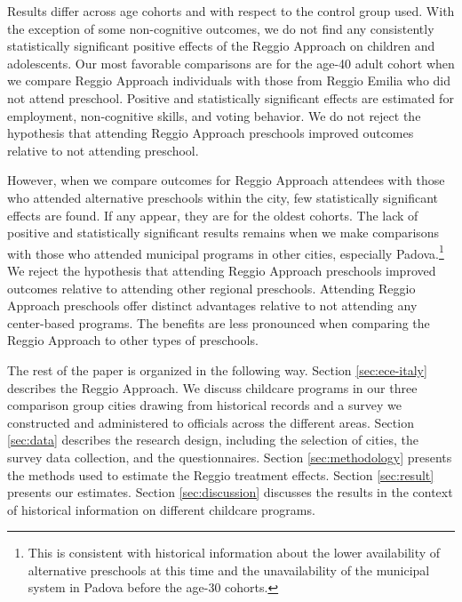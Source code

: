 Results differ across age cohorts and with respect to the control group used. With the exception of some non-cognitive outcomes, we do not find any consistently statistically significant positive effects of the Reggio Approach on children and adolescents. Our most favorable comparisons are for the age-40 adult cohort when we compare Reggio Approach individuals with those from Reggio Emilia who did not attend preschool. Positive and statistically significant effects are estimated for employment, non-cognitive skills, and voting behavior. We do not reject the hypothesis that attending Reggio Approach preschools improved outcomes relative to not attending preschool.

However, when we compare outcomes for Reggio Approach attendees with those who attended alternative preschools within the city, few statistically significant effects are found. If any appear, they are for the oldest cohorts. The lack of positive and statistically significant results remains when we make comparisons with those who attended municipal programs in other cities, especially Padova.\footnote{This is consistent with historical information about the lower availability of alternative preschools at this time and the unavailability of the municipal system in Padova before the age-30 cohorts.} We reject the hypothesis that attending Reggio Approach preschools improved outcomes relative to attending other regional preschools. Attending Reggio Approach preschools offer distinct advantages relative to not attending any center-based programs. The benefits are less pronounced when comparing the Reggio Approach to other types of preschools.

The rest of the paper is organized in the following way. Section \ref{sec:ece-italy} describes the Reggio Approach. We discuss childcare programs in our three comparison group cities drawing from historical records and a survey we constructed and administered to officials across the different areas. Section \ref{sec:data} describes the research design, including the selection of cities, the survey data collection, and the questionnaires. Section \ref{sec:methodology} presents the methods used to estimate the Reggio treatment effects. Section \ref{sec:result} presents our estimates. Section \ref{sec:discussion} discusses the results in the context of historical information on different childcare programs.

